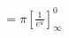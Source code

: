 \documentclass[preview]{standalone}
\begin{document}
\begin{align*}
= \pi [\frac{1}{e^u}]_{\infty}^0
\end{align*}
\end{document}
